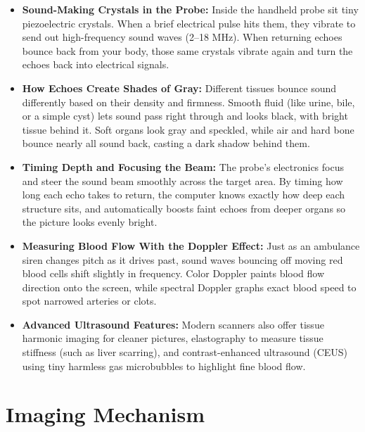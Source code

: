 \begin{itemize}
    \item \textbf{Sound-Making Crystals in the Probe:} Inside the handheld probe sit tiny piezoelectric crystals. When a brief electrical pulse hits them, they vibrate to send out high-frequency sound waves (2--18 MHz). When returning echoes bounce back from your body, those same crystals vibrate again and turn the echoes back into electrical signals.
    \item \textbf{How Echoes Create Shades of Gray:} Different tissues bounce sound differently based on their density and firmness. Smooth fluid (like urine, bile, or a simple cyst) lets sound pass right through and looks black, with bright tissue behind it. Soft organs look gray and speckled, while air and hard bone bounce nearly all sound back, casting a dark shadow behind them.
    \item \textbf{Timing Depth and Focusing the Beam:} The probe's electronics focus and steer the sound beam smoothly across the target area. By timing how long each echo takes to return, the computer knows exactly how deep each structure sits, and automatically boosts faint echoes from deeper organs so the picture looks evenly bright.
    \item \textbf{Measuring Blood Flow With the Doppler Effect:} Just as an ambulance siren changes pitch as it drives past, sound waves bouncing off moving red blood cells shift slightly in frequency. Color Doppler paints blood flow direction onto the screen, while spectral Doppler graphs exact blood speed to spot narrowed arteries or clots.
    \item \textbf{Advanced Ultrasound Features:} Modern scanners also offer tissue harmonic imaging for cleaner pictures, elastography to measure tissue stiffness (such as liver scarring), and contrast-enhanced ultrasound (CEUS) using tiny harmless gas microbubbles to highlight fine blood flow.
\end{itemize}

\section{Imaging Mechanism}

